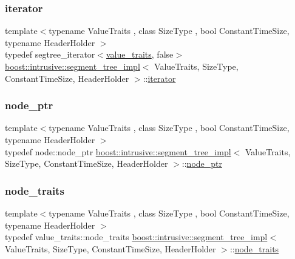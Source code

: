 \subsubsection{\texorpdfstring{iterator}{iterator}}
{\footnotesize\ttfamily template$<$typename Value\+Traits , class Size\+Type , bool Constant\+Time\+Size, typename Header\+Holder $>$ \\
typedef segtree\+\_\+iterator$<$\hyperlink{classboost_1_1intrusive_1_1segment__tree__impl_a929c1b3f1e6bb851a911b9b54a4c0dc2}{value\+\_\+traits}, false$>$ \hyperlink{classboost_1_1intrusive_1_1segment__tree__impl}{boost\+::intrusive\+::segment\+\_\+tree\+\_\+impl}$<$ Value\+Traits, Size\+Type, Constant\+Time\+Size, Header\+Holder $>$\+::\hyperlink{classboost_1_1intrusive_1_1segment__tree__impl_a9f1be9b01be5078fb59b2e34520b374a}{iterator}}

\mbox{\label{classboost_1_1intrusive_1_1segment__tree__impl_a3fcf2b7f82b582e4dcf22eca8914f664}} 
\subsubsection{\texorpdfstring{node\+\_\+ptr}{node\_ptr}}
{\footnotesize\ttfamily template$<$typename Value\+Traits , class Size\+Type , bool Constant\+Time\+Size, typename Header\+Holder $>$ \\
typedef node\+::node\+\_\+ptr \hyperlink{classboost_1_1intrusive_1_1segment__tree__impl}{boost\+::intrusive\+::segment\+\_\+tree\+\_\+impl}$<$ Value\+Traits, Size\+Type, Constant\+Time\+Size, Header\+Holder $>$\+::\hyperlink{classboost_1_1intrusive_1_1segment__tree__impl_a3fcf2b7f82b582e4dcf22eca8914f664}{node\+\_\+ptr}}

\mbox{\label{classboost_1_1intrusive_1_1segment__tree__impl_a4530e7ef515902af7c906bbe0c6bb5f2}} 
\subsubsection{\texorpdfstring{node\+\_\+traits}{node\_traits}}
{\footnotesize\ttfamily template$<$typename Value\+Traits , class Size\+Type , bool Constant\+Time\+Size, typename Header\+Holder $>$ \\
typedef value\+\_\+traits\+::node\+\_\+traits \hyperlink{classboost_1_1intrusive_1_1segment__tree__impl}{boost\+::intrusive\+::segment\+\_\+tree\+\_\+impl}$<$ Value\+Traits, Size\+Type, Constant\+Time\+Size, Header\+Holder $>$\+::\hyperlink{classboost_1_1intrusive_1_1segment__tree__impl_a4530e7ef515902af7c906bbe0c6bb5f2}{node\+\_\+traits}}

